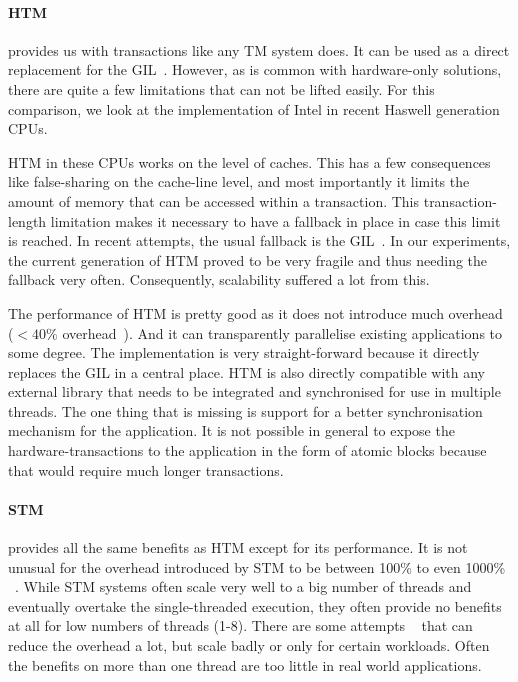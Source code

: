 \documentclass{sigplanconf}
\begin{document}
\paragraph{HTM} provides us with transactions like any TM system does.
It can be used as a direct replacement for the GIL~\cite{nicholas06,odaira14,fuad10}. However, as is
common with hardware-only solutions, there are quite a few limitations
that can not be lifted easily. For this comparison, we look at the
implementation of Intel in recent Haswell generation CPUs.

HTM in these CPUs works on the level of caches. This has a few
consequences like false-sharing on the cache-line level, and most
importantly it limits the amount of memory that can be accessed within
a transaction. This transaction-length limitation makes it necessary
to have a fallback in place in case this limit is reached. In recent
attempts, the usual fallback is the GIL~\cite{odaira14,fuad10}. In our
experiments, the current generation of HTM proved to be very fragile
and thus needing the fallback very often. Consequently, scalability
suffered a lot from this.

The performance of HTM is pretty good as it does not introduce much
overhead ($<40\%$ overhead~\cite{odaira14}). And it can transparently
parallelise existing applications to some degree. The implementation
is very straight-forward because it directly replaces the GIL in a
central place. HTM is also directly compatible with any external
library that needs to be integrated and synchronised for use in
multiple threads. The one thing that is missing is support for a
better synchronisation mechanism for the application. It is not
possible in general to expose the hardware-transactions to the
application in the form of atomic blocks because that would require
much longer transactions.


\paragraph{STM} provides all the same benefits as HTM except for its
performance.  It is not unusual for the overhead introduced by STM to
be between 100\% to even 1000\% ~\cite{cascaval08,drago11}. While STM
systems often scale very well to a big number of threads and
eventually overtake the single-threaded execution, they often provide
no benefits at all for low numbers of threads (1-8). There are some
attempts ~\cite{warmhoff13,spear09} that can reduce the overhead a lot,
but scale badly or only for certain workloads. Often the benefits
on more than one thread are too little in real world applications.
\end{document}
